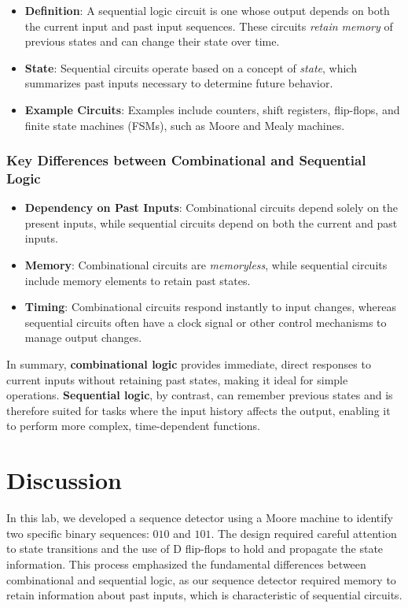 \documentclass[12pt]{article}
\begin{document}
\begin{itemize}
	\item \textbf{Definition}: A sequential logic circuit is one whose output depends on both the current input and past input sequences. These circuits \textit{retain memory} of previous states and can change their state over time.
	\item \textbf{State}: Sequential circuits operate based on a concept of \textit{state}, which summarizes past inputs necessary to determine future behavior.
	\item \textbf{Example Circuits}: Examples include counters, shift registers, flip-flops, and finite state machines (FSMs), such as Moore and Mealy machines.
\end{itemize}

\subsubsection*{Key Differences between Combinational and Sequential Logic}
\begin{itemize}
	\item \textbf{Dependency on Past Inputs}: Combinational circuits depend solely on the present inputs, while sequential circuits depend on both the current and past inputs.
	\item \textbf{Memory}: Combinational circuits are \textit{memoryless}, while sequential circuits include memory elements to retain past states.
	\item \textbf{Timing}: Combinational circuits respond instantly to input changes, whereas sequential circuits often have a clock signal or other control mechanisms to manage output changes.
\end{itemize}

In summary, \textbf{combinational logic} provides immediate, direct responses to current inputs without retaining past states, making it ideal for simple operations. \textbf{Sequential logic}, by contrast, can remember previous states and is therefore suited for tasks where the input history affects the output, enabling it to perform more complex, time-dependent functions.

\section*{Discussion}

In this lab, we developed a sequence detector using a Moore machine to identify two specific binary sequences: \( 010 \) and \( 101 \). The design required careful attention to state transitions and the use of D flip-flops to hold and propagate the state information. This process emphasized the fundamental differences between combinational and sequential logic, as our sequence detector required memory to retain information about past inputs, which is characteristic of sequential circuits.
\end{document}
